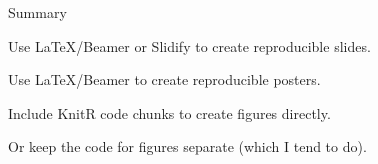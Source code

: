 \documentclass[12pt,t]{beamer}
\begin{document}
\begin{frame}{Summary}

\bbi
\item Use LaTeX/Beamer or Slidify to create reproducible slides.
\item Use LaTeX/Beamer to create reproducible posters.
\item Include KnitR code chunks to create figures directly.
\item Or keep the code for figures separate (which I tend to do).
\ei

\end{frame}
\end{document}
